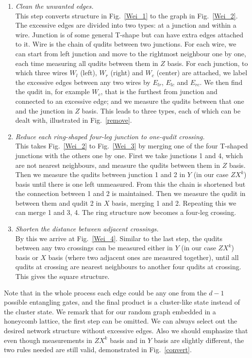 \documentclass[aps,amsfonts,pra,twocolumn,showpacs]{revtex4-1}
\begin{document}
\begin{enumerate}
	\item \textit{Clean the unwanted edges.} \\
		This step converts structure in Fig.~\ref{Wei_1} to the graph in Fig.~\ref{Wei_2}. The excessive edges are divided into two types: at a junction and within a wire. Junction is of some general T-shape but can have extra edges attached to it. Wire is the chain of qudits between two junctions. For each wire, we can start from left junction and move to the rightmost neighbour one by one, each time measuring all qudits between them in $Z$ basis. For each junction, to which three wires $W_l$ (left), $W_r$ (right) and $W_c$ (center) are attached, we label the excessive edges between any two wires by $E_{lr}$, $E_{lc}$ and $E_{rc}$. We then find the qudit in, for example $W_c$, that is the furthest from junction and connected to an excessive edge; and we measure the qudits between that one and the junction in $Z$ basis. This leads to three types, each of which can be dealt with, illustrated in Fig.~\ref{remove}.
	\item \textit{Reduce each ring-shaped four-leg junction to one-qudit crossing.} \\
		This takes Fig.~\ref{Wei_2} to Fig.~\ref{Wei_3} by merging one of the four T-shaped junctions with the others one by one. First we take junctions 1 and 4, which are not nearest neighbours, and measure the qudits between them in $Z$ basis. Then we measure the qudits between junction 1 and 2 in $Y$ (in our case $ZX^k$) basis until there is one left unmeasured. From this the chain is shortened but the connection between 1 and 2 is maintained. Then we measure the qudit in between them and qudit 2 in $X$ basis, merging 1 and 2. Repeating this we can merge 1 and 3, 4. The ring structure now becomes a four-leg crossing.                                                                               
	\item \textit{Shorten the distance between adjacent crossings.} \\
		By this we arrive at Fig.~\ref{Wei_4}. Similar to the last step, the qudits between any two crossings can be measured either in $Y$ (in our case $ZX^k$) basis or $X$ basis (where two adjacent ones are measured together), until all qudits at crossing are nearest neighbours to another four qudits at crossing. This gives the square structure.
\end{enumerate}

Note that in the whole process each edge could be any one from the $d-1$ possible entangling gates, and the final product is a cluster-like state instead of the cluster state. We remark that for our random graph embedded in a honeycomb lattice, the first step can be omitted. We can always select out the desired network structure without excessive edges. Also we should emphasize that even though measurements in $ZX^k$ basis and in $Y$ basis are slightly different, the two rules needed are still valid, demonstrated in Fig.~\ref{convert}.
\end{document}
